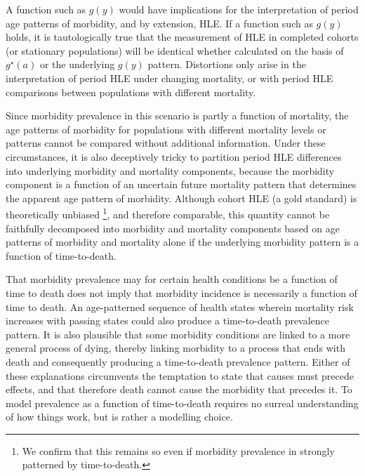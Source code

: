 \documentclass[11pt,oneside,a4paper]{article} %
\begin{document}
A function such as $g(y)$ would have implications for the interpretation of
period age patterns of morbidity, and by extension, HLE. If a function such as $g(y)$ holds, it is tautologically true that the
measurement of HLE in completed cohorts (or stationary populations)
will be identical whether calculated on the basis of $g^\star(a)$ or the
underlying $g(y)$ pattern. Distortions only arise in the interpretation of
period HLE under changing mortality, or with period HLE comparisons between
populations with different mortality. 


Since morbidity prevalence in this scenario is partly a function of mortality,
 the age patterns of morbidity for populations with different mortality
levels or patterns cannot be compared without additional information. Under
these circumstances, it is also deceptively tricky to partition period HLE
differences into underlying morbidity and mortality components, because the
morbidity component is a function of an uncertain future mortality pattern
that determines the apparent age pattern of morbidity. Although cohort HLE (a
gold standard) is theoretically unbiased \citep{imai2007estimation}\footnote{We confirm that this remains so even if morbidity prevalence in strongly patterned by time-to-death.}, and therefore comparable, this quantity cannot be faithfully
decomposed into morbidity and mortality components based on age patterns of morbidity and mortality alone if
the underlying morbidity pattern is a function of time-to-death.

That morbidity prevalence may for certain health conditions be a function of
time to death does not imply that morbidity incidence is necessarily a function of time to death. An
age-patterned sequence of health states wherein mortality risk increases with
passing states could also produce a time-to-death prevalence pattern. It is also
plausible that some morbidity conditions are linked to a more general process of
dying, thereby linking morbidity to a process that ends with death and
consequently producing a time-to-death prevalence pattern. Either of
these explanations circumvents the temptation to state that causes must
precede effects, and that therefore death cannot cause the morbidity that
precedes it. To model prevalence as a function of time-to-death requires no
surreal understanding of how things work, but is rather a modelling choice.
 
\end{document}
